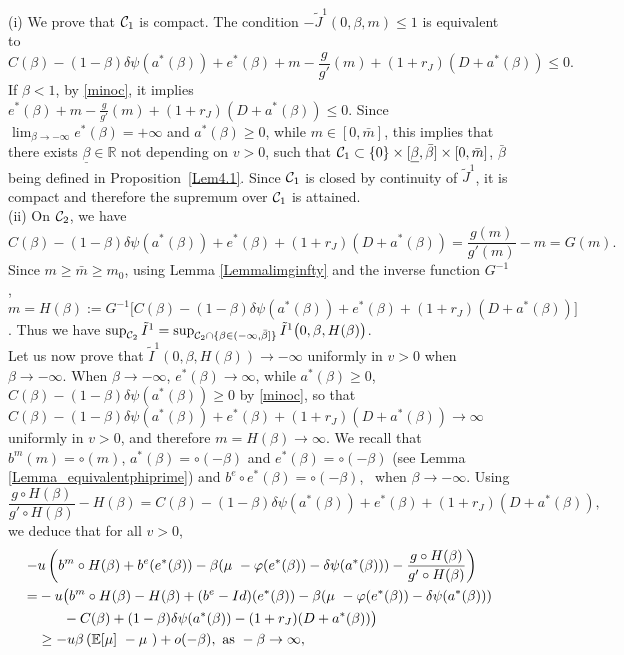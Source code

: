 \documentclass{svjour3}
\begin{document}
(i) We prove that ${\cal C}_1$ is compact. 
The condition $-\tilde J^1(0,\beta,m)\leq 1$ is equivalent to
$$C(\beta)-(1-\beta)\delta\psi(a^*(\beta))+e^*(\beta)+m-\frac{g}{g'}(m)+(1+r_J)(D+a^*(\beta))\leq 0.$$
If $\beta<1$, by \eqref{minoc}, it implies $e^*(\beta)+m-\frac{g}{g'}(m)+(1+r_J)(D+a^*(\beta))\leq 0$. Since $\lim_{\beta\to-\infty}e^*(\beta)=+\infty$
 and $a^*(\beta)\geq 0$, while $m\in[0,\bar{m}]$, this implies that there exists $\underline\beta\in\mathbb{R}$ not depending on $v>0$, such that ${\cal C}_1\subset \{0\}\times[\underline\beta,\bar\beta]\times[0,\bar m]$, $\bar \beta$ being defined in Proposition~\ref{Lem4.1}. Since ${\cal C}_1$ is closed by continuity of $\tilde J^1$, it is compact and therefore the supremum over ${\cal C}_1$ is attained.\\

(ii) On ${\cal C}_2$, we have $$C(\beta)-(1-\beta)\delta\psi(a^*(\beta))+e^*(\beta)+(1+r_J)(D+a^*(\beta))=\frac{g(m)}{g'(m)}-m=G(m).$$ 
Since $m\geq \bar{m}\geq m_0$, using Lemma \ref{Lemmalimginfty} and the inverse function $G^{-1}$, $m=H(\beta):=G^{-1}\big[C(\beta)-(1-\beta)\delta\psi(a^*(\beta))+e^*(\beta)+(1+r_J)(D+a^*(\beta))\big]$.
Thus we have $\sup_{{\cal C}_2}\tilde I^1=\sup_{{\cal C}_2\cap\{\beta \in (-\infty,\bar \beta]\}}\tilde I^1\big(0,\beta,H(\beta)\big)$. \\
Let us now prove that $\tilde I^1(0,\beta,H(\beta))\to-\infty$ uniformly in $v>0$ when $\beta\to-\infty$.
When $\beta\to-\infty$, $e^*(\beta)\to\infty$, while $a^*(\beta)\geq 0$, $C(\beta)-(1-\beta)\delta\psi(a^*(\beta))\geq 0$ by \eqref{minoc}, so that
$C(\beta)-(1-\beta)\delta\psi(a^*(\beta))+e^*(\beta)+(1+r_J)(D+a^*(\beta))\to\infty$
 uniformly in $v>0$, and therefore $m=H(\beta)\to\infty$.
We recall that  $b^m(m)=\circ(m)$, $a^*(\beta)=\circ(-\beta)$ and $e^*(\beta)=\circ(-\beta)$ (see Lemma \ref{Lemma_equivalentphiprime}) and 
$b ^e\circ e^*(\beta)=\circ(-\beta)$,~ when
$\beta\to-\infty$. Using $$\frac{g\circ H(\beta)}{g'\circ H(\beta)}-H(\beta)=C(\beta)-(1-\beta)\delta\psi(a^*(\beta))+e^*(\beta)+
(1+r_J)(D+a^*(\beta)),$$
we deduce that for all $v>0$,
\begin{align}
   -&u\left(b^m\circ H(\beta)+b^e(e^*(\beta))-\beta(\mu~-\varphi(e^*(\beta))-\delta \psi(a^*(\beta)))-\frac{g\circ H(\beta)}{g'\circ H(\beta)}\right)\notag\\
=&-u\big(b^m\circ H(\beta)-H(\beta)+(b^e-Id)(e^*(\beta))-\beta(\mu~-\varphi(e^*(\beta))-\delta \psi(a^*(\beta)))\\&\phantom{-u\big(}-C(\beta)+(1-\beta)\delta\psi(a^*(\beta))-(1+r_J)(D+a^*(\beta))\big)\notag
\\
&\geq-u\beta\left(\mathbb{E}[\mu]~ -\mu~\right)+o(-\beta),
 \mbox{ as }-\beta\to\infty,\label{inegaliteenbetapb1}
\end{align}
\end{document}
